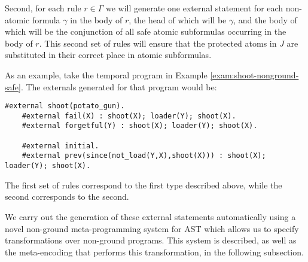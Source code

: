 Second, for each rule $r \in \Gamma$ we will generate one external
statement for each non-atomic formula $\gamma$ in the body of $r$, the
head of which will be $\gamma$, and the body of which will be the
conjunction of all safe atomic subformulas occurring in the body of
$r$. This second set of rules will ensure that the protected atoms in
$J$ are substituted in their correct place in atomic subformulas.

\begin{example}
  As an example, take the temporal program in Example
  \ref{exam:shoot-nonground-safe}. The externals generated for that program would be:
  \begin{lstlisting}[numbers=none]
    #external shoot(potato_gun).
    #external fail(X) : shoot(X); loader(Y); shoot(X).
    #external forgetful(Y) : shoot(X); loader(Y); shoot(X).

    #external initial.
    #external prev(since(not_load(Y,X),shoot(X))) : shoot(X); loader(Y); shoot(X).
  \end{lstlisting}
  The first set of rules correspond to the first type described above,
  while the second corresponds to the second.
\end{example}


We carry out the generation of these external statements automatically
using a novel non-ground meta-programming system for AST which allows
us to specify transformations over non-ground programs. This system is
described, as well as the meta-encoding that performs this
transformation, in the following subsection.
